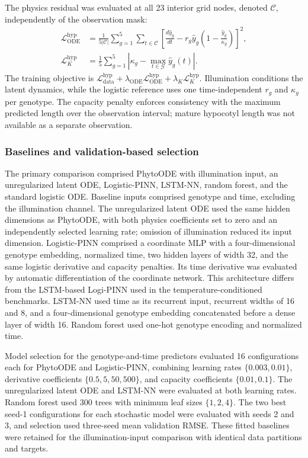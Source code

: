 \documentclass[preprint,12pt,authoryear]{elsarticle}
\begin{document}
The physics residual was evaluated at all 23 interior grid nodes, denoted $\mathcal C$, independently of the observation mask:
\begin{align}
 \mathcal L_{\mathrm{ODE}}^{\mathrm{hyp}}
 &=\frac{1}{5|\mathcal C|}\sum_{g=1}^{5}\sum_{t\in\mathcal C}
 \left[\frac{d\hat y_g}{dt}
 -r_g\hat y_g\left(1-\frac{\hat y_g}{\kappa_g}\right)\right]^2,
 \label{eq:hypocotyl_residual}\\
 \mathcal L_K^{\mathrm{hyp}}
 &=\frac{1}{5}\sum_{g=1}^{5}
 \left|\kappa_g-\max_{t\in\mathcal G}\hat y_g(t)\right|.
 \label{eq:hypocotyl_capacity}
\end{align}
The training objective is $\mathcal L_{\mathrm{data}}^{\mathrm{hyp}}+\lambda_{\mathrm{ODE}}\mathcal L_{\mathrm{ODE}}^{\mathrm{hyp}}+\lambda_K\mathcal L_K^{\mathrm{hyp}}$. Illumination conditions the latent dynamics, while the logistic reference uses one time-independent $r_g$ and $\kappa_g$ per genotype. The capacity penalty enforces consistency with the maximum predicted length over the observation interval; mature hypocotyl length was not available as a separate observation.

\subsubsection{Baselines and validation-based selection}

The primary comparison comprised PhytoODE with illumination input, an unregularized latent ODE, Logistic-PINN, LSTM-NN, random forest, and the standard logistic ODE. Baseline inputs comprised genotype and time, excluding the illumination channel. The unregularized latent ODE used the same hidden dimensions as PhytoODE, with both physics coefficients set to zero and an independently selected learning rate; omission of illumination reduced its input dimension. Logistic-PINN comprised a coordinate MLP with a four-dimensional genotype embedding, normalized time, two hidden layers of width 32, and the same logistic derivative and capacity penalties. Its time derivative was evaluated by automatic differentiation of the coordinate network. This architecture differs from the LSTM-based Logi-PINN used in the temperature-conditioned benchmarks. LSTM-NN used time as its recurrent input, recurrent widths of 16 and 8, and a four-dimensional genotype embedding concatenated before a dense layer of width 16. Random forest used one-hot genotype encoding and normalized time.

Model selection for the genotype-and-time predictors evaluated 16 configurations each for PhytoODE and Logistic-PINN, combining learning rates $\{0.003,0.01\}$, derivative coefficients $\{0.5,5,50,500\}$, and capacity coefficients $\{0.01,0.1\}$. The unregularized latent ODE and LSTM-NN were evaluated at both learning rates. Random forest used 300 trees with minimum leaf sizes $\{1,2,4\}$. The two best seed-1 configurations for each stochastic model were evaluated with seeds 2 and 3, and selection used three-seed mean validation RMSE. These fitted baselines were retained for the illumination-input comparison with identical data partitions and targets.
\end{document}
